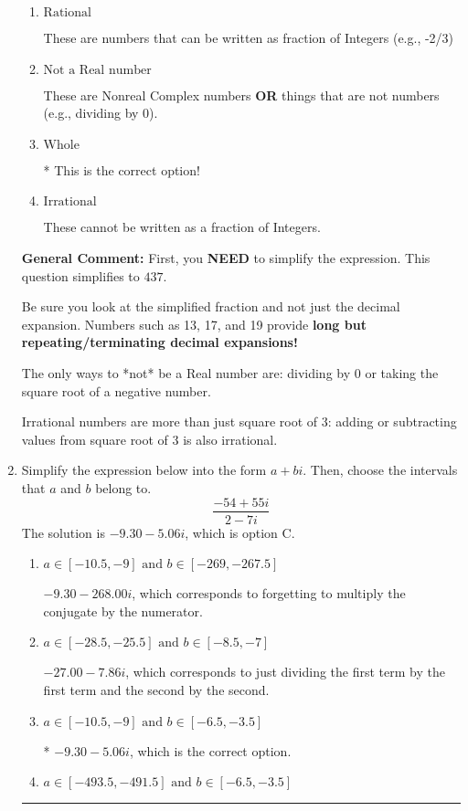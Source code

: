 \documentclass{extbook}[14pt]
\newcommand{\litem}[1]{\item #1

\rule{\textwidth}{0.4pt}}
\begin{document}
\begin{enumerate}
{\begin{enumerate}[label=\Alph*.]
These are the negative and positive counting numbers (..., -3, -2, -1, 0, 1, 2, 3, ...)
\item \( \text{Rational} \)

These are numbers that can be written as fraction of Integers (e.g., -2/3)
\item \( \text{Not a Real number} \)

These are Nonreal Complex numbers \textbf{OR} things that are not numbers (e.g., dividing by 0).
\item \( \text{Whole} \)

* This is the correct option!
\item \( \text{Irrational} \)

These cannot be written as a fraction of Integers.
\end{enumerate}

\textbf{General Comment:} First, you \textbf{NEED} to simplify the expression. This question simplifies to $437$. 
 
 Be sure you look at the simplified fraction and not just the decimal expansion. Numbers such as 13, 17, and 19 provide \textbf{long but repeating/terminating decimal expansions!} 
 
 The only ways to *not* be a Real number are: dividing by 0 or taking the square root of a negative number. 
 
 Irrational numbers are more than just square root of 3: adding or subtracting values from square root of 3 is also irrational.
}
\litem{
Simplify the expression below into the form $a+bi$. Then, choose the intervals that $a$ and $b$ belong to.
\[ \frac{-54 + 55 i}{2 - 7 i} \]The solution is \( -9.30  - 5.06 i \), which is option C.\begin{enumerate}[label=\Alph*.]
\item \( a \in [-10.5, -9] \text{ and } b \in [-269, -267.5] \)

 $-9.30  - 268.00 i$, which corresponds to forgetting to multiply the conjugate by the numerator.
\item \( a \in [-28.5, -25.5] \text{ and } b \in [-8.5, -7] \)

 $-27.00  - 7.86 i$, which corresponds to just dividing the first term by the first term and the second by the second.
\item \( a \in [-10.5, -9] \text{ and } b \in [-6.5, -3.5] \)

* $-9.30  - 5.06 i$, which is the correct option.
\item \( a \in [-493.5, -491.5] \text{ and } b \in [-6.5, -3.5] \)


\end{enumerate}}
\end{enumerate}
\end{document}
